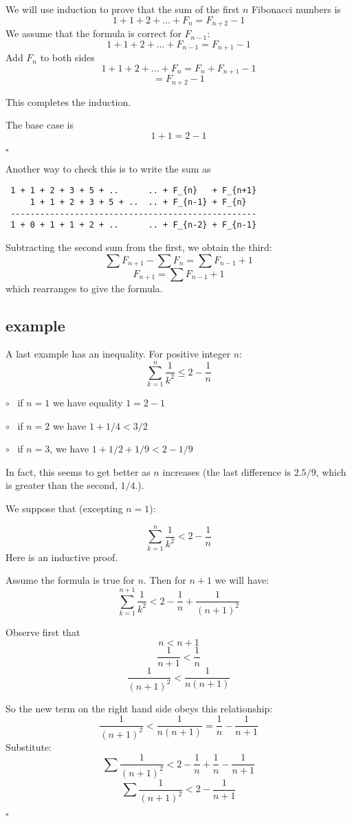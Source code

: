 \documentclass[11pt, oneside]{article}
\begin{document}
We will use induction to prove that the sum of the first $n$ Fibonacci numbers is
\[ 1 + 1 + 2 + \dots + F_n = F_{n+2} - 1 \]
We assume that the formula is correct for $F_{n - 1}$:
\[ 1 + 1 + 2 + \dots + F_{n-1} = F_{n+1} - 1 \]
Add $F_{n}$ to both sides
\[ 1 + 1 + 2 + \dots + F_{n} = F_{n} + F_{n+1} - 1 \]
\[ = F_{n+2} - 1 \]

This completes the induction.

The base case is 
\[ 1 + 1 = 2 - 1 \]

$\square$

Another way to check this is to write the sum as

\begin{verbatim}
 1 + 1 + 2 + 3 + 5 + ..      .. + F_{n}   + F_{n+1}
     1 + 1 + 2 + 3 + 5 + ..  .. + F_{n-1} + F_{n}
 --------------------------------------------------
 1 + 0 + 1 + 1 + 2 + ..      .. + F_{n-2} + F_{n-1}
\end{verbatim}

Subtracting the second sum from the first, we obtain the third:
\[ \sum F_{n+1} - \sum F_n =  \sum F_{n-1} + 1  \]
\[ F_{n+1}  =  \sum F_{n-1} + 1  \]
which rearranges to give the formula.

\subsection*{example}

A last example has an inequality.  For positive integer $n$:
\[ \sum_{k=1}^{n} \frac{1}{k^2} \le 2 - \frac{1}{n} \]

$\circ$ \ if $n=1$ we have equality $1 = 2 - 1$

$\circ$ \ if $n=2$ we have $1 + 1/4 < 3/2$

$\circ$ \ if $n = 3$, we have $1 + 1/2 + 1/9 < 2 - 1/9$ 

In fact, this seems to get better as $n$ increases (the last difference is $2.5/9$, which is greater than the second, $1/4$.).  

We suppose that (excepting $n=1$):

\[ \sum_{k=1}^{n} \frac{1}{k^2} < 2 - \frac{1}{n} \]
Here is an inductive proof.

Assume the formula is true for $n$.  Then for $n+1$ we will have:
\[ \sum_{k=1}^{n+1} \frac{1}{k^2} < 2 - \frac{1}{n} + \frac{1}{(n+1)^2}  \]

Observe first that
\[ n < n + 1 \]
\[ \frac{1}{n+1} < \frac{1}{n} \]
\[ \frac{1}{(n + 1)^2} < \frac{1}{n(n+1)} \]

So the new term on the right hand side obeys this relationship:
\[ \frac{1}{(n + 1)^2} <  \frac{1}{n(n+1)} = \frac{1}{n} - \frac{1}{n + 1} \]
Substitute:
\[ \sum \frac{1}{(n+1)^2} < 2 - \frac{1}{n} + \frac{1}{n} - \frac{1}{n + 1} \]
\[ \sum \frac{1}{(n+1)^2} < 2 - \frac{1}{n + 1} \]

$\square$
\end{document}
